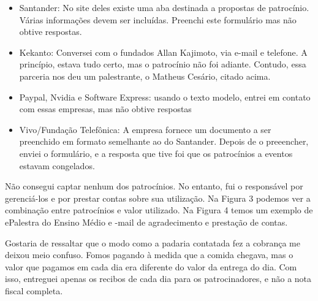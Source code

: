 \documentclass[12pt,letterpaper]{article}
\begin{document}
	\begin{itemize}
		\item Santander: No site deles existe uma aba destinada a propostas de patrocínio. Várias informações devem ser incluídas. Preenchi este formulário mas não obtive respostas.
		\item Kekanto: Conversei com o fundados Allan Kajimoto, via e-mail e telefone. A princípio, estava tudo certo, mas o patrocínio não foi adiante. Contudo, essa parceria nos deu um palestrante, o Matheus Cesário, citado acima.
		\item Paypal, Nvidia e Software Express: usando o texto modelo\cite{modelo_pat}, entrei em contato com essas empresas, mas não obtive respostas
		\item Vivo/Fundação Telefônica: A empresa fornece um documento a ser preenchido em formato semelhante ao do Santander. Depois de o preeencher, enviei o formulário, e a resposta que tive foi que os patrocínios a eventos estavam congelados.
	\end{itemize}
	
	Não consegui captar nenhum dos patrocínios. No entanto, fui o responsável por gerenciá-los e por prestar contas sobre sua utilização.
	Na Figura 3 podemos ver a combinação entre patrocínios e valor utilizado. Na Figura 4 temos um exemplo de ePalestra do Ensino Médio e -mail de agradecimento e prestação de contas.
	
	Gostaria de ressaltar que o modo como a padaria contatada fez a cobrança me deixou meio confuso. Fomos pagando à medida que a comida chegava, mas o valor que pagamos em cada dia era diferente do valor da entrega do dia. Com isso, entreguei apenas os recibos de cada dia para os patrocinadores, e não a nota fiscal completa.
	
\end{document}
